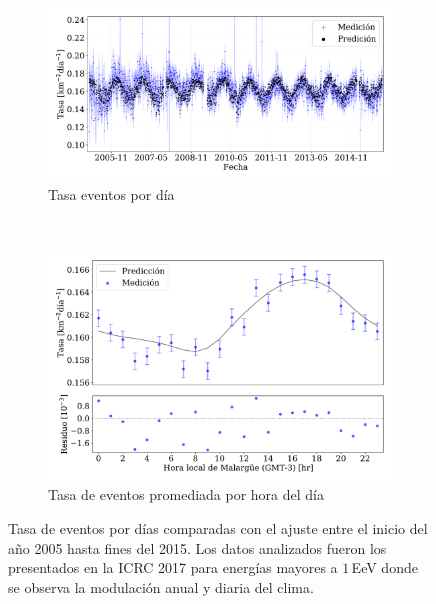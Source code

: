         \begin{figure}[H]
            \centering
            \begin{subfigure}[b]{0.875\textwidth}
            \includegraphics[width=\textwidth]{Graphs/rate_dayly/herald_old_above_1EeV_rate_day.pdf}
            \caption{Tasa eventos por día}\label{fig:rate_dayly_ICRC_2017}
            \end{subfigure}\\
            \begin{subfigure}[b]{0.875\textwidth}
            \includegraphics[width=\textwidth]{Graphs/rate_hour_of_the_day/1EeV_ICRC_2015_old_herald.pdf}
            \caption{Tasa de eventos promediada por hora del día }\label{fig:rate_hod_ICRC_2017}
            \end{subfigure}%
            \caption{Tasa de eventos por días comparadas con el ajuste entre el inicio del año 2005 hasta fines del 2015. Los datos analizados fueron los presentados en la ICRC 2017 para energías mayores a $1\,$EeV donde se observa la modulación anual y diaria del clima. }\label{fig:rate_2017_05-15}
        \end{figure}


